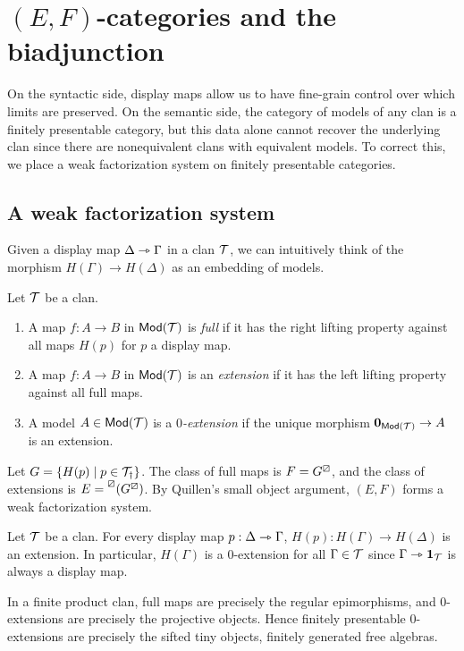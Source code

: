 \documentclass[a4paper]{article}
\begin{document}
\section{$(E,F)$-categories and the biadjunction}

On the syntactic side, display maps allow us to have fine-grain control over which limits are preserved.
On the semantic side, the category of models of any clan is a finitely presentable category, but this data alone cannot recover the underlying clan since there are nonequivalent clans with equivalent models.
To correct this, we place a weak factorization system on finitely presentable categories.

\subsection{A weak factorization system}

Given a display map $\Delta \rightarrowtriangle \Gamma$ in a clan $\mathcal{T}$, we can intuitively think of the morphism $H(\Gamma) \to H(\Delta)$ as an embedding of models.
\begin{definition}
  Let $\mathcal{T}$ be a clan.
  \begin{enumerate}
  \item A map $f : A \to B$ in $\mathsf{Mod}(\mathcal{T})$ is \emph{full} if it has the right lifting property against all maps $H(p)$ for $p$ a display map.
  \item A map $f : A \to B$ in $\mathsf{Mod}(\mathcal{T})$ is an \emph{extension} if it has the left lifting property against all full maps.
  \item A model $A \in \mathsf{Mod}(\mathcal{T})$ is a \emph{$0$-extension} if the unique morphism $\mathbf{0}_{\mathsf{Mod}(\mathcal{T})} \to A$ is an extension.
  \end{enumerate}
\end{definition}

\begin{remark}
  Let $G = \{H(p) \mid p \in \mathcal{T}_{\dag}\}$.
  The class of full maps is $F = G^{\boxslash}$, and the class of extensions is $E = \prescript{\boxslash}{}{(G^{\boxslash})}$.
  By Quillen's small object argument, $(E,F)$ forms a weak factorization system.
\end{remark}

\begin{remark}
  Let $\mathcal{T}$ be a clan.
  For every display map $p : \Delta \rightarrowtriangle \Gamma$, $H(p) : H(\Gamma) \to H(\Delta)$ is an extension.
  In particular, $H(\Gamma)$ is a $0$-extension for all $\Gamma \in \mathcal{T}$ since $\Gamma \rightarrowtriangle \mathbf{1}_{\mathcal{T}}$ is always a display map.

  In a finite product clan, full maps are precisely the regular epimorphisms, and $0$-extensions are precisely the projective objects.
  Hence finitely presentable $0$-extensions are precisely the sifted tiny objects, \ie finitely generated free algebras.
\end{remark}
\end{document}
